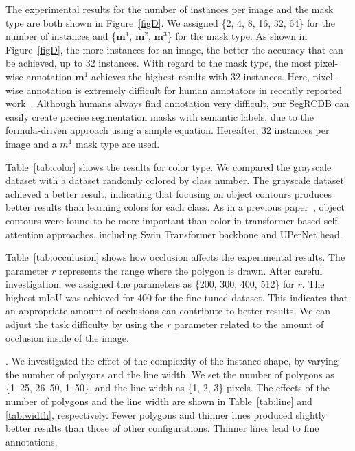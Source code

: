 \documentclass[10pt,twocolumn,letterpaper]{article}
\begin{document}
The experimental results for the number of instances per image and the mask type are both shown in Figure~\ref{figD}. We assigned \{2, 4, 8, 16, 32, 64\} for the number of instances and \{$\bm{m}^{1}$, $\bm{m}^{2}$, $\bm{m}^{3}$\} for the mask type.
As shown in Figure~\ref{figD}, the more instances for an image, the better the accuracy that can be achieved, up to 32 instances.
With regard to the mask type, the most pixel-wise annotation $\bm{m}^{1}$ achieves the highest results with 32 instances. Here, pixel-wise annotation is extremely difficult for human annotators in recently reported work~\cite{qin2022}. Although humans always find annotation very difficult, our SegRCDB can easily create precise segmentation masks with semantic labels, due to the formula-driven approach using a simple equation.  
Hereafter, 32 instances per image and a ${m}^{1}$ mask type are used.

 Table~\ref{tab:color} shows the results for color type. We compared the grayscale dataset with a dataset randomly colored by class number. The grayscale dataset achieved a better result, indicating that focusing on object contours produces better results than learning colors for each class. As in a previous paper~\cite{Kataoka_2022_CVPR}, object contours were found to be more important than color in transformer-based self-attention approaches, including Swin Transformer backbone and UPerNet head.

 Table~\ref{tab:occulusion} shows how occlusion affects the experimental results. The parameter $r$ represents the range where the polygon is drawn. After careful investigation, we assigned the parameters as \{200, 300, 400, 512\} for $r$. The highest mIoU was achieved for 400 for the fine-tuned dataset. This indicates that an appropriate amount of occlusions can contribute to better results. We can adjust the task difficulty by using the $r$ parameter related to the amount of occlusion inside of the image. 

. We investigated the effect of the complexity of the instance shape, by varying the number of polygons and the line width. We set the number of polygons as \{1--25, 26--50, 1--50\}, and the line width as \{1, 2, 3\} pixels. The effects of the number of polygons and the line width are shown in Table~\ref{tab:line} and \ref{tab:width}, respectively. Fewer polygons and thinner lines produced slightly better results than those of other configurations. Thinner lines lead to fine annotations. 
\end{document}
